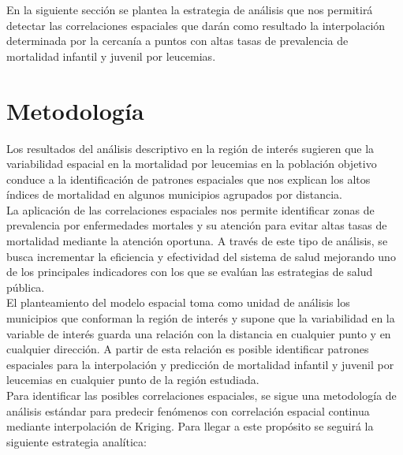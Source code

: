 \documentclass[11pt, oneside]{book}
\begin{document}
En la siguiente sección se plantea la estrategia de análisis que nos permitirá detectar las correlaciones espaciales que darán como resultado la interpolación determinada por la cercanía a puntos con altas tasas de prevalencia de mortalidad infantil y juvenil por leucemias.

\thispagestyle{empty}

\chapter{Metodología}
Los resultados del análisis descriptivo en la región de interés sugieren que la variabilidad espacial en la mortalidad por leucemias en la población objetivo conduce a la identificación de patrones espaciales que nos explican los altos índices de mortalidad en algunos municipios agrupados por distancia.\\ 

La aplicación de las correlaciones espaciales nos permite identificar zonas de prevalencia por enfermedades mortales y su atención para evitar altas tasas de mortalidad mediante la atención oportuna. A través de este tipo de análisis, se busca incrementar la eficiencia y efectividad del sistema de salud mejorando uno de los principales indicadores con los que se evalúan las estrategias de salud pública.\\

El planteamiento del modelo espacial toma como unidad de análisis los municipios que conforman la región de interés y supone que la variabilidad en la variable de interés guarda una relación con la distancia en cualquier punto y en cualquier dirección. A partir de esta relación es posible identificar patrones espaciales para la interpolación y predicción de mortalidad infantil y juvenil por leucemias en cualquier punto de la región estudiada.\\

Para identificar las posibles correlaciones espaciales, se sigue una metodología de análisis estándar para predecir fenómenos con correlación espacial continua mediante interpolación de Kriging. Para llegar a este propósito se seguirá la siguiente estrategia analítica:\\
\end{document}
